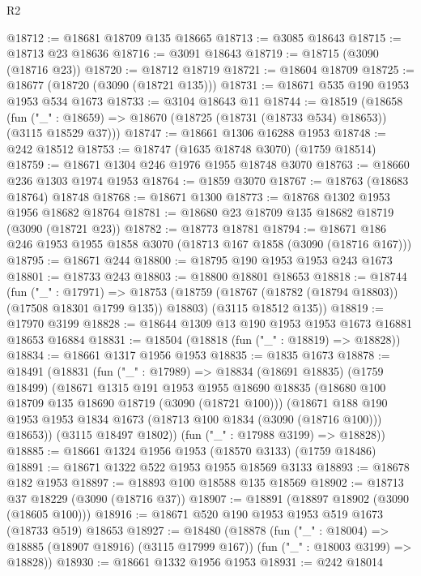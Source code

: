 \begin{lexlean}{R2}
\begin{coremodule}
@18712 := @18681 @18709 @135 @18665
@18713 := @3085 @18643
@18715 := @18713 @23 @18636
@18716 := @3091 @18643
@18719 := @18715 (@3090 (@18716 @23))
@18720 := @18712 @18719
@18721 := @18604 @18709
@18725 := @18677 (@18720 (@3090 (@18721 @135)))
@18731 := @18671 @535 @190 @1953 @1953 @534 @1673
@18733 := @3104 @18643 @11
@18744 := @18519
    (@18658
      (fun ("_" : @18659) => @18670 (@18725 (@18731 (@18733 @534) @18653)) (@3115 @18529 @37)))
@18747 := @18661 @1306 @16288 @1953
@18748 := @242 @18512
@18753 := @18747 (@1635 @18748 @3070) (@1759 @18514)
@18759 := @18671 @1304 @246 @1976 @1955 @18748 @3070
@18763 := @18660 @236 @1303 @1974 @1953
@18764 := @1859 @3070
@18767 := @18763 (@18683 @18764) @18748
@18768 := @18671 @1300
@18773 := @18768 @1302 @1953 @1956 @18682 @18764
@18781 := @18680 @23 @18709 @135 @18682 @18719 (@3090 (@18721 @23))
@18782 := @18773 @18781
@18794 := @18671 @186 @246 @1953 @1955 @1858 @3070 (@18713 @167 @1858 (@3090 (@18716 @167)))
@18795 := @18671 @244
@18800 := @18795 @190 @1953 @1953 @243 @1673
@18801 := @18733 @243
@18803 := @18800 @18801 @18653
@18818 := @18744
    (fun ("_" : @17971) =>
    @18753
      (@18759 (@18767 (@18782 (@18794 @18803)) (@17508 @18301 @1799 @135)) @18803)
      (@3115 @18512 @135))
@18819 := @17970 @3199
@18828 := @18644 @1309 @13 @190 @1953 @1953 @1673 @16881 @18653 @16884
@18831 := @18504 (@18818 (fun ("_" : @18819) => @18828))
@18834 := @18661 @1317 @1956 @1953
@18835 := @1835 @1673
@18878 := @18491
    (@18831
      (fun ("_" : @17989) =>
      @18834
        (@18691 @18835)
        (@1759 @18499)
        (@18671
          @1315
          @191
          @1953
          @1955
          @18690
          @18835
          (@18680 @100 @18709 @135 @18690 @18719 (@3090 (@18721 @100)))
          (@18671
            @188
            @190
            @1953
            @1953
            @1834
            @1673
            (@18713 @100 @1834 (@3090 (@18716 @100)))
            @18653))
        (@3115 @18497 @1802))
      (fun ("_" : @17988 @3199) => @18828))
@18885 := @18661 @1324 @1956 @1953 (@18570 @3133) (@1759 @18486)
@18891 := @18671 @1322 @522 @1953 @1955 @18569 @3133
@18893 := @18678 @182 @1953
@18897 := @18893 @100 @18588 @135 @18569
@18902 := @18713 @37 @18229 (@3090 (@18716 @37))
@18907 := @18891 (@18897 @18902 (@3090 (@18605 @100)))
@18916 := @18671 @520 @190 @1953 @1953 @519 @1673 (@18733 @519) @18653
@18927 := @18480
    (@18878
      (fun ("_" : @18004) => @18885 (@18907 @18916) (@3115 @17999 @167))
      (fun ("_" : @18003 @3199) => @18828))
@18930 := @18661 @1332 @1956 @1953
@18931 := @242 @18014

\end{coremodule}
\end{lexlean}
